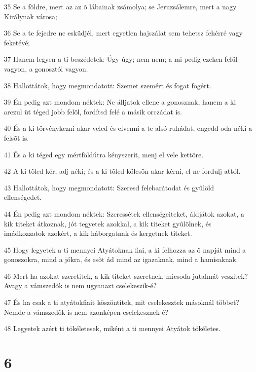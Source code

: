 \par 35 Se a földre, mert az az õ lábainak zsámolya; se Jeruzsálemre, mert a nagy Királynak városa;
\par 36 Se a te fejedre ne esküdjél, mert egyetlen hajszálat sem tehetsz fehérré vagy feketévé;
\par 37 Hanem legyen a ti beszédetek: Úgy úgy; nem nem; a mi pedig ezeken felül vagyon, a gonosztól vagyon.
\par 38 Hallottátok, hogy megmondatott: Szemet szemért és fogat fogért.
\par 39 Én pedig azt mondom néktek: Ne álljatok ellene a gonosznak, hanem a ki arczul üt téged jobb felõl, fordítsd felé a másik orczádat is.
\par 40 És a ki törvénykezni akar veled és elvenni a te alsó ruhádat, engedd oda néki a felsõt is.
\par 41 És a ki téged egy mértföldútra kényszerít, menj el vele kettõre.
\par 42 A ki tõled kér, adj néki; és a ki tõled kölcsön akar kérni, el ne fordulj attól.
\par 43 Hallottátok, hogy megmondatott: Szeresd felebarátodat és gyûlöld ellenségedet.
\par 44 Én pedig azt mondom néktek: Szeressétek ellenségeiteket, áldjátok azokat, a kik titeket átkoznak, jót tegyetek azokkal, a kik titeket gyûlölnek,  és imádkozzatok azokért, a kik háborgatnak és kergetnek titeket.
\par 45 Hogy legyetek a ti mennyei Atyátoknak fiai, a ki felhozza az õ napját mind a gonoszokra, mind a jókra, és esõt ád mind az igazaknak, mind a hamisaknak.
\par 46 Mert ha azokat szeretitek, a kik titeket szeretnek, micsoda jutalmát veszitek? Avagy a vámszedõk is nem ugyanazt cselekeszik-é?
\par 47 És ha csak a ti atyátokfiait köszöntitek, mit cselekesztek másoknál többet? Nemde a vámszedõk is nem azonképen cselekesznek-é?
\par 48 Legyetek azért ti tökéletesek, miként a ti mennyei Atyátok tökéletes.

\chapter{6}

